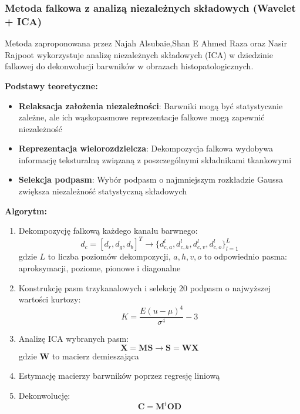 \documentclass{article}
\begin{document}
\subsubsection{Metoda falkowa z analizą niezależnych składowych (Wavelet + ICA)}
Metoda zaproponowana przez Najah Alsubaie,Shan E Ahmed Raza oraz Nasir Rajpoot wykorzystuje analizę niezależnych składowych (ICA) w dziedzinie falkowej do dekonwolucji barwników w obrazach histopatologicznych.

\textbf{Podstawy teoretyczne:}
\begin{itemize}
    \item \textbf{Relaksacja założenia niezależności}: Barwniki mogą być statystycznie zależne, ale ich wąskopasmowe reprezentacje falkowe mogą zapewnić niezależność
    \item \textbf{Reprezentacja wielorozdzielcza}: Dekompozycja falkowa wydobywa informację teksturalną związaną z poszczególnymi składnikami tkankowymi
    \item \textbf{Selekcja podpasm}: Wybór podpasm o najmniejszym rozkładzie Gaussa zwiększa niezależność statystyczną składowych
\end{itemize}

\textbf{Algorytm:}
\begin{enumerate}
    \item Dekompozycję falkową każdego kanału barwnego:
    \begin{equation}
        d_c = [d_r, d_g, d_b]^T \rightarrow \{d_{c,a}^l, d_{c,h}^l, d_{c,v}^l, d_{c,o}^l\}_{l=1}^L
    \end{equation}
    gdzie $L$ to liczba poziomów dekompozycji, $a,h,v,o$ to odpowiednio pasma: aproksymacji, poziome, pionowe i diagonalne
    
    \item Konstrukcję pasm trzykanalowych i selekcję 20 podpasm o najwyższej wartości kurtozy:
    \begin{equation}
        K = \frac{E(u - \mu)^4}{\sigma^4} - 3
    \end{equation}
    
    \item Analizę ICA wybranych pasm:
    \begin{equation}
        \mathbf{X} = \mathbf{MS} \rightarrow \mathbf{S} = \mathbf{WX}
    \end{equation}
    gdzie $\mathbf{W}$ to macierz demieszająca
    
    \item Estymację macierzy barwników poprzez regresję liniową
    \item Dekonwolucję:
    \begin{equation}
        \mathbf{C} = \mathbf{M}^{t}\mathbf{OD}
    \end{equation}
\end{enumerate}
\end{document}
